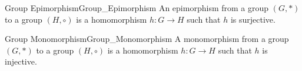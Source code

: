         \begin{fdefinition}{Group Epimorphism}{Group_Epimorphism}
            An epimorphism from a group $(G,*)$ to a group $(H,\circ)$ is a
            homomorphism $h:{G}\rightarrow{H}$ such that $h$ is surjective.
        \end{fdefinition}
        \begin{fdefinition}{Group Monomorphism}{Group_Monomorphism}
            A monomorphism from a group $(G,*)$ to a group $(H,\circ)$ is a
            homomorphism $h:{G}\rightarrow{H}$ such that $h$ is injective.
        \end{fdefinition}